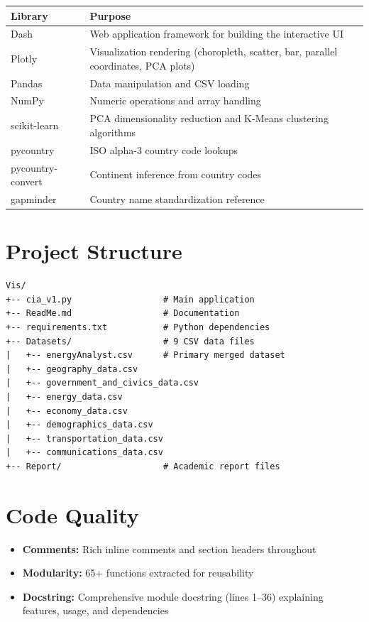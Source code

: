 \documentclass[11pt]{article}
\begin{document}
\begin{table}[H]
\centering
\begin{tabular}{@{}lp{10cm}@{}}
\toprule
\textbf{Library} & \textbf{Purpose} \\
\midrule
Dash & Web application framework for building the interactive UI \\
Plotly & Visualization rendering (choropleth, scatter, bar, parallel coordinates, PCA plots) \\
Pandas & Data manipulation and CSV loading \\
NumPy & Numeric operations and array handling \\
scikit-learn & PCA dimensionality reduction and K-Means clustering algorithms \\
pycountry & ISO alpha-3 country code lookups \\
pycountry-convert & Continent inference from country codes \\
gapminder & Country name standardization reference \\
\bottomrule
\end{tabular}
\end{table}

\section{Project Structure}

\begin{verbatim}
Vis/
+-- cia_v1.py                  # Main application 
+-- ReadMe.md                  # Documentation
+-- requirements.txt           # Python dependencies
+-- Datasets/                  # 9 CSV data files
|   +-- energyAnalyst.csv      # Primary merged dataset
|   +-- geography_data.csv
|   +-- government_and_civics_data.csv
|   +-- energy_data.csv
|   +-- economy_data.csv
|   +-- demographics_data.csv
|   +-- transportation_data.csv
|   +-- communications_data.csv
+-- Report/                    # Academic report files
\end{verbatim}

\section{Code Quality}

\begin{itemize}
    \item \textbf{Comments:} Rich inline comments and section headers throughout
    \item \textbf{Modularity:} 65+ functions extracted for reusability
    \item \textbf{Docstring:} Comprehensive module docstring (lines 1--36) explaining features, usage, and dependencies
\end{itemize}
\end{document}

